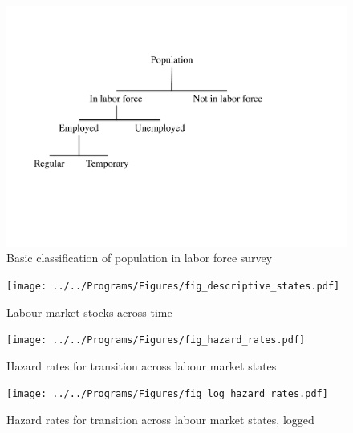 \begin{figure}
	\includegraphics[scale=0.65, trim=2cm 6cm 7cm 4cm, clip]{Figures/population}
	\caption{Basic classification of population in labor force survey}
	\label{fig:LFS_clas}
\end{figure}

\begin{landscape}
\begin{figure}
\centering
	\texttt{[image: ../../Programs/Figures/fig\_descriptive\_states.pdf]}
	\caption{Labour market stocks across time}
	\label{fig:LFS_states}
\end{figure}
\end{landscape}


\begin{landscape}
\begin{figure}
\centering
	\texttt{[image: ../../Programs/Figures/fig\_hazard\_rates.pdf]}
	\caption{Hazard rates for transition across labour market states}
	\label{fig:hazard_rates}
\end{figure}
\end{landscape}

\begin{landscape}
\begin{figure}
\centering
	\texttt{[image: ../../Programs/Figures/fig\_log\_hazard\_rates.pdf]}
	\caption{Hazard rates for transition across labour market states, logged}
	\label{fig:log_hazard_rates}
\end{figure}
\end{landscape}

